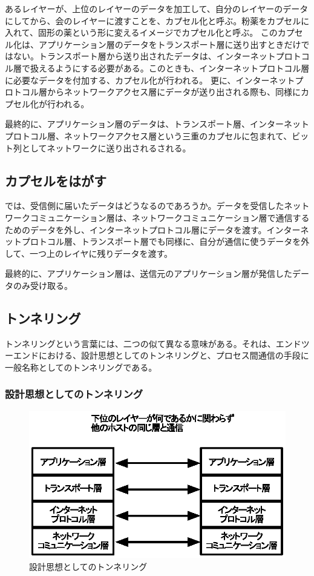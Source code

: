 あるレイヤーが、上位のレイヤーのデータを加工して、自分のレイヤーのデータにしてから、会のレイヤーに渡すことを、カプセル化と呼ぶ。粉薬をカプセルに入れて、固形の薬という形に変えるイメージでカプセル化と呼ぶ。
このカプセル化は、アプリケーション層のデータをトランスポート層に送り出すときだけではない。トランスポート層から送り出されたデータは、インターネットプロトコル層で扱えるようにする必要がある。このときも、インターネットプロトコル層に必要なデータを付加する、カプセル化が行われる。
更に、インターネットプロトコル層からネットワークアクセス層にデータが送り出される際も、同様にカプセル化が行われる。

最終的に、アプリケーション層のデータは、トランスポート層、インターネットプロトコル層、ネットワークアクセス層という三重のカプセルに包まれて、ビット列としてネットワークに送り出されるされる。

\subsection{カプセルをはがす}
では、受信側に届いたデータはどうなるのであろうか。データを受信したネットワークコミュニケーション層は、ネットワークコミュニケーション層で通信するためのデータを外し、インターネットプロトコル層にデータを渡す。インターネットプロトコル層、トランスポート層でも同様に、自分が通信に使うデータを外して、一つ上のレイヤに残りデータを渡す。

最終的に、アプリケーション層は、送信元のアプリケーション層が発信したデータのみ受け取る。

\subsection{トンネリング}
トンネリングという言葉には、二つの似て異なる意味がある。それは、エンドツーエンドにおける、設計思想としてのトンネリングと、プロセス間通信の手段に一般名称としてのトンネリングである。

\subsubsection{設計思想としてのトンネリング}

\begin{figure}
	\includegraphics[width=12cm,clip]{draw/tunneling.eps}
	\caption{設計思想としてのトンネリング}
	\label{fig:tunneling}
\end{figure}

